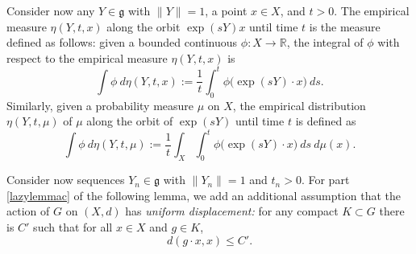 \documentclass[10pt,reqno]{amsart}
\theoremstyle{Theorem}
\theoremstyle{definition}
\theoremstyle{remark}
\newcommand{\note}[1]{\marginpar{{\color{red}\footnotesize \begin{spacing}{1}#1\end{spacing}}}}
\newcommand{\R}{\mathbb {R}}
\newcommand{\lieg}{\mathfrak g}
\def\blue{}
\begin{document}
Consider now any $Y\in \lieg$ with $\|Y\|=1$, a point  $x\in X$,  and $t>0$.
The     empirical measure $\eta(Y,t,x)$ along the orbit $\exp (sY) x$ until time $t$ is the measure defined as follows: given a bounded continuous $\phi\colon X\to \R$, the integral of $\phi$ with respect to the empirical measure  $\eta(Y,t,x)$ is
$$
\int \phi \ d \eta (Y, t, x) := \frac{1}{t} \int_0^{t} \phi \big(\exp (sY) \cdot x\big) \ d s.$$
Similarly, given a probability measure $\mu$ on $X$,   the empirical distribution $\eta(Y,t,\mu)$ of $\mu$ along the orbit of $\exp (sY) $ until time $t$ is defined as %
$$
\int \phi \ d \eta(Y,t, \mu):= \frac{1}{t} \int_X \int_0^{t} \phi \big(\exp (sY) \cdot x\big) \ d s \ d \mu(x).$$


Consider now sequences  $Y_n\in \lieg$ with $\|Y_n\|=1$ and  $t_n>0$.   For part \ref{lazylemmac} of the following lemma, we add an additional  assumption that the action of $G$ on $(X,d)$ has \emph{uniform displacement:} for any compact $K\subset G$ there is $C'$ such that for all $x\in X$ and $g\in K$, $$d(g\cdot x, x )\le C'.$$
\end{document}

